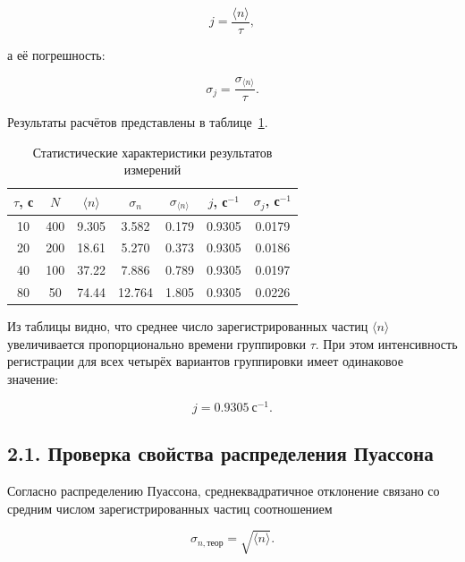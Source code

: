 \documentclass[12pt,a4paper]{article}
\begin{document}
\begin{equation}
    j=\frac{\langle n\rangle}{\tau},
    \label{eq:intensity}
\end{equation}

а её погрешность:

\begin{equation}
    \sigma_j=\frac{\sigma_{\langle n\rangle}}{\tau}.
    \label{eq:intensity_error}
\end{equation}

Результаты расчётов представлены в таблице~\ref{tab:statistics}.

\begin{table}[H]
\centering
\caption{Статистические характеристики результатов измерений}
\label{tab:statistics}
\begin{tabular}{c|c|c|c|c|c|c}
\toprule
$\tau$, с & $N$ & $\langle n\rangle$ & $\sigma_n$
& $\sigma_{\langle n\rangle}$ & $j$, с$^{-1}$ & $\sigma_j$, с$^{-1}$ \\
\midrule
10 & 400 & 9.305 & 3.582 & 0.179 & 0.9305 & 0.0179 \\
20 & 200 & 18.61 & 5.270 & 0.373 & 0.9305 & 0.0186 \\
40 & 100 & 37.22 & 7.886 & 0.789 & 0.9305 & 0.0197 \\
80 & 50  & 74.44 & 12.764 & 1.805 & 0.9305 & 0.0226 \\
\bottomrule
\end{tabular}
\end{table}

Из таблицы видно, что среднее число зарегистрированных частиц $\langle n\rangle$ увеличивается пропорционально времени группировки $\tau$. При этом интенсивность регистрации для всех четырёх вариантов группировки имеет одинаковое значение:

\begin{equation}
    j=0.9305~\text{с}^{-1}.
\end{equation}

\subsection*{2.1. Проверка свойства распределения Пуассона}

Согласно распределению Пуассона, среднеквадратичное отклонение связано со средним числом зарегистрированных частиц соотношением

\begin{equation}
    \sigma_{n,\text{теор}}=\sqrt{\langle n\rangle}.
    \label{eq:sigma_theory}
\end{equation}
\end{document}
